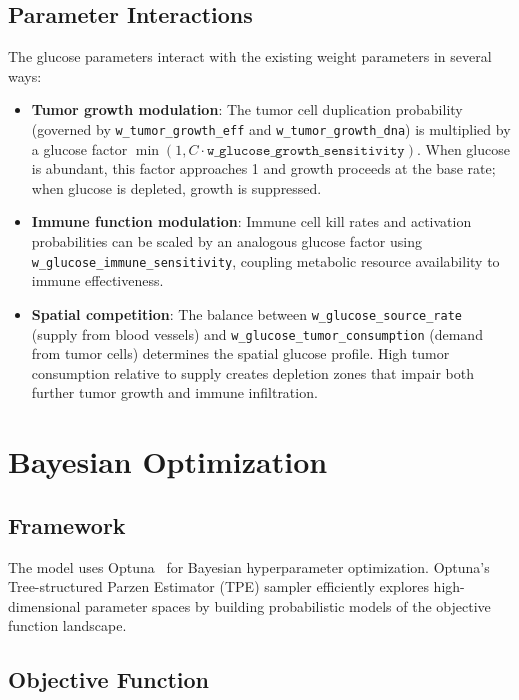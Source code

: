 \subsection{Parameter Interactions}

The glucose parameters interact with the existing weight parameters in several ways:

\begin{itemize}
    \item \textbf{Tumor growth modulation}: The tumor cell duplication probability (governed by \texttt{w\_tumor\_growth\_eff} and \texttt{w\_tumor\_growth\_dna}) is multiplied by a glucose factor $\min(1, C \cdot \texttt{w\_glucose\_growth\_sensitivity})$. When glucose is abundant, this factor approaches 1 and growth proceeds at the base rate; when glucose is depleted, growth is suppressed.

    \item \textbf{Immune function modulation}: Immune cell kill rates and activation probabilities can be scaled by an analogous glucose factor using \texttt{w\_glucose\_immune\_sensitivity}, coupling metabolic resource availability to immune effectiveness.

    \item \textbf{Spatial competition}: The balance between \texttt{w\_glucose\_source\_rate} (supply from blood vessels) and \texttt{w\_glucose\_tumor\_consumption} (demand from tumor cells) determines the spatial glucose profile. High tumor consumption relative to supply creates depletion zones that impair both further tumor growth and immune infiltration.
\end{itemize}

\section{Bayesian Optimization}
\label{sec:bayesian-optimization}

\subsection{Framework}

The model uses Optuna~\cite{optuna} for Bayesian hyperparameter optimization. Optuna's Tree-structured Parzen Estimator (TPE) sampler efficiently explores high-dimensional parameter spaces by building probabilistic models of the objective function landscape.

\subsection{Objective Function}

